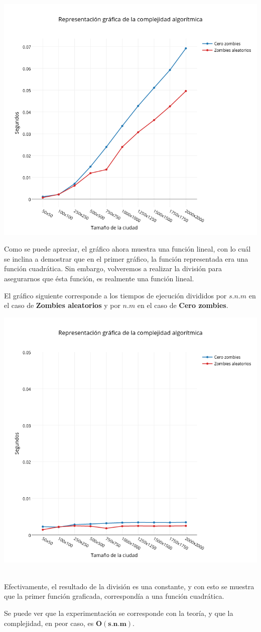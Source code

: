 \includegraphics[width=15cm,keepaspectratio=yes]{imagenes/ej2/linealizacion.png}

Como se puede apreciar, el gráfico ahora muestra una función lineal, con lo cuál se inclina a demostrar que en el primer gráfico, la función representada era una función cuadrática.
Sin embargo, volveremos a realizar la división para asegurarnos que ésta función, es realmente una función lineal.

\newpage

El gr\'afico siguiente corresponde a los tiempos de ejecuci\'on divididos por $s.n.m$ en el caso de \textbf{Zombies aleatorios}  y por $n.m$ en el caso de \textbf{Cero zombies}.

\includegraphics[width=15cm,keepaspectratio=yes]{imagenes/ej2/constantizacion.png}\

Efectivamente, el resultado de la división es una constante, y con esto se muestra que la primer función graficada, correspondía a una función cuadrática.

Se puede ver que la experimentación se corresponde con la teoría, y que la complejidad, en peor caso, es $\mathbf{O(s.n.m)}$.

